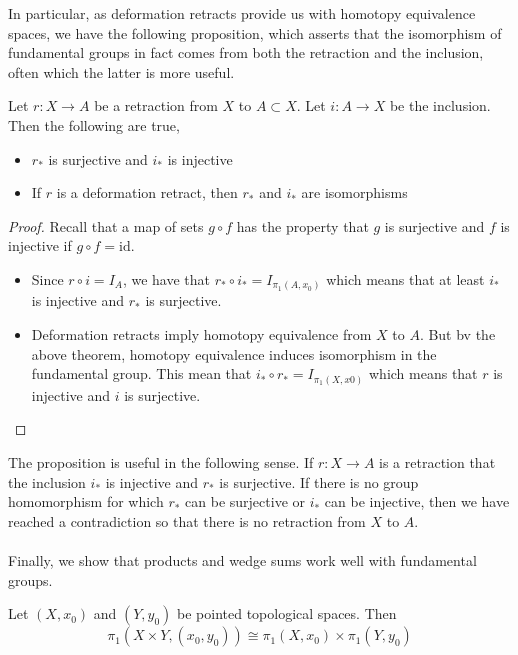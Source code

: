 \documentclass[a4paper]{article}
\begin{document}
In particular, as deformation retracts provide us with homotopy equivalence spaces, we have the following proposition, which asserts that the isomorphism of fundamental groups in fact comes from both the retraction and the inclusion, often which the latter is more useful. 

\begin{prp}{}{} Let $r:X\to A$ be a retraction from $X$ to $A\subset X$. Let $i:A\to X$ be the inclusion. Then the following are true, 
\begin{itemize}
\item $r_\ast$ is surjective and $i_\ast$ is injective
\item If $r$ is a deformation retract, then $r_\ast$ and $i_\ast$ are isomorphisms
\end{itemize} \tcbline
\begin{proof}
Recall that a map of sets $g\circ f$ has the property that $g$ is surjective and $f$ is injective if $g\circ f=\text{id}$. 
\begin{itemize}
\item Since $r\circ i=I_A$, we have that $r_\ast\circ i_\ast=I_{\pi_1(A,x_0)}$ which means that at least $i_\ast$ is injective and $r_\ast$ is surjective. 
\item Deformation retracts imply homotopy equivalence from $X$ to $A$. But bv the above theorem, homotopy equivalence induces isomorphism in the fundamental group. This mean that $i_\ast\circ r_\ast=I_{\pi_1(X,x0)}$ which means that $r$ is injective and $i$ is surjective. 
\end{itemize}
\end{proof}
\end{prp}

The proposition is useful in the following sense. If $r:X\to A$ is a retraction that the inclusion $i_\ast$ is injective and $r_\ast$ is surjective. If there is no group homomorphism for which $r_\ast$ can be surjective or $i_\ast$ can be injective, then we have reached a contradiction so that there is no retraction from $X$ to $A$. \\~\\

Finally, we show that products and wedge sums work well with fundamental groups. 

\begin{prp}{}{} Let $(X,x_0)$ and $(Y,y_0)$ be pointed topological spaces. Then $$\pi_1(X\times Y,(x_0,y_0))\cong\pi_1(X,x_0)\times\pi_1(Y,y_0)$$
\end{prp}
\end{document}
